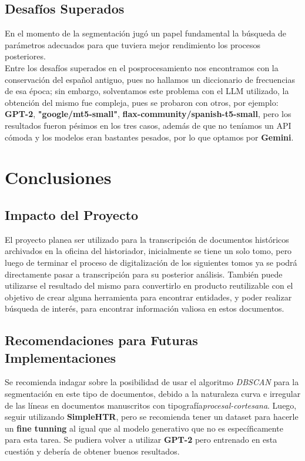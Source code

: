 \documentclass[11pt,a4paper]{article}
\begin{document}
\subsection{Desafíos Superados}

En el momento de la segmentación jug\'o un papel fundamental la b\'usqueda de par\'ametros adecuados para que tuviera mejor rendimiento los procesos posteriores.\\

Entre los desaf\'ios superados en el posprocesamiento nos encontramos con la conservaci\'on del español antiguo, pues no hallamos un diccionario de frecuencias de esa época; sin embargo, solventamos este problema con el LLM utilizado, la obtención del mismo fue compleja, pues se probaron con otros, por ejemplo: \textbf{GPT-2}, \textbf{"google/mt5-small"}, \textbf{flax-community/spanish-t5-small}, pero los resultados fueron p\'esimos en los tres casos, adem\'as de que no ten\'iamos un API c\'omoda y los modelos eran bastantes pesados, por lo que optamos por \textbf{Gemini}.

\section{Conclusiones} 
\subsection{Impacto del Proyecto} 

El proyecto planea ser utilizado para la transcripción de documentos hist\'oricos archivados en la oficina del historiador, inicialmente se tiene un solo tomo, pero luego de terminar el proceso de digitalizaci\'on de los siguientes tomos ya se podr\'a directamente pasar a transcripci\'on para su posterior an\'alisis. También puede utilizarse el resultado del mismo para convertirlo en producto reutilizable con el objetivo de crear alguna herramienta para encontrar entidades, y poder realizar búsqueda de interés, para encontrar información valiosa en estos documentos. 

\subsection{Recomendaciones para Futuras Implementaciones}
Se recomienda indagar sobre la posibilidad de usar el algoritmo \textit{DBSCAN} para la segmentación en este tipo de documentos, debido a la naturaleza curva e irregular de las líneas en documentos manuscritos con tipografía\textit{procesal-cortesana}. Luego, seguir utilizando \textbf{SimpleHTR}, pero se recomienda tener un dataset para hacerle un \textbf{fine tunning} al igual que al modelo generativo que no es espec\'ificamente para esta tarea. Se pudiera volver a utilizar \textbf{GPT-2} pero entrenado en esta cuesti\'on y debería de obtener buenos resultados.
\end{document}
